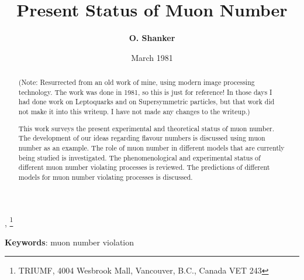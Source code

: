 \documentclass[twoside]{article}
\begin{document}


\newtheorem{theorem}{Theorem}[section]
\newtheorem{lemma}[theorem]{Lemma}

\theoremstyle{definition}
\newtheorem{definition}[theorem]{Definition}
\newtheorem{example}[theorem]{Example}
\newtheorem{xca}[theorem]{Exercise}

\theoremstyle{remark}
\newtheorem{remark}[theorem]{Remark}



\date{March 1981}
\lhead[]{}
\rhead[]{}

\title{\bf{Present Status of Muon Number}}

\maketitle


\author{\textbf{O. Shanker}},
\thanks{ TRIUMF, 4004 Wesbrook Mall, Vancouver, B.C., Canada VET 243 }

\thispagestyle{fancy}

\begin{abstract}
(Note: Resurrected from an  old work of mine, using modern image processing technology.
The work was done in 1981, so this is just for reference! In those days I had done work
on Leptoquarks and on Supersymmetric particles, but that work did not make it into this
writeup. I have not made any changes to the writeup.)

This work surveys the present experimental and theoretical status
of muon number. The development of our ideas regarding flavour numbers
is discussed using muon number as an example.
The role of muon number
in different models that are currently being studied is investigated.
The phenomenological and experimental status of different muon number
violating processes is reviewed. The predictions of different models
for muon number violating processes is discussed.

\end{abstract}
{\textbf {Keywords}:} muon number violation


\end{document}
